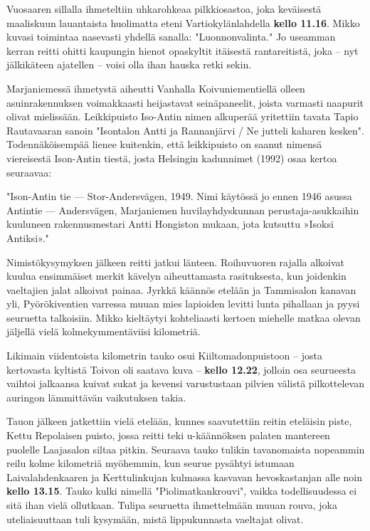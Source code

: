 \begin{multicols}{2}
	Vuosaaren sillalla ihmeteltiin uhkarohkeaa pilkkiosastoa, joka
	keväisestä maaliskuun lauantaista huolimatta eteni Vartiokylänlahdella
	\textbf{kello 11.16}. Mikko kuvasi toimintaa nasevasti yhdellä sanalla:
	"Luonnonvalinta." Jo useamman kerran reitti ohitti kaupungin hienot
	opaskyltit itäisestä rantareitistä, joka – nyt jälkikäteen ajatellen –
	voisi olla ihan hauska retki sekin.

	Marjaniemessä ihmetystä aiheutti Vanhalla Koivuniementiellä olleen
	asuinrakennuksen voimakkaasti heijastavat seinäpaneelit, joista
	varmasti naapurit olivat mielissään. Leikkipuisto Iso-Antin nimen
	alkuperää yritettiin tavata Tapio Rautavaaran sanoin "Isontalon Antti
	ja Rannanjärvi / Ne jutteli kaharen kesken". Todennäköisempää lienee
	kuitenkin, että leikkipuisto on saanut nimensä viereisestä Ison-Antin
	tiestä, josta Helsingin kadunnimet (1992) osaa kertoa seuraavaa:

	"Ison-Antin tie — Stor-Andersvägen, 1949. Nimi käytössä jo ennen 1946
	asussa Antintie — Andersvägen, Marjaniemen huvilayhdyskunnan
	perustaja-asukkaihin kuuluneen rakennusmestari Antti Hongiston mukaan,
	jota kutsuttu »Isoksi Antiksi»."

	Nimistökysymyksen jälkeen reitti jatkui länteen. Roihuvuoren rajalla
	alkoivat kuulua ensimmäiset merkit kävelyn aiheuttamasta rasituksesta,
	kun joidenkin vaeltajien jalat alkoivat painaa. Jyrkkä käännös etelään
	ja Tammisalon kanavan yli, Pyörökiventien varressa muuan mies lapioiden
	levitti lunta pihallaan ja pyysi seuruetta talkoisiin. Mikko kieltäytyi
	kohteliaasti kertoen miehelle matkaa olevan jäljellä vielä
	kolmekymmentäviisi kilometriä.

	Likimain viidentoista kilometrin tauko osui Kiiltomadonpuistoon – josta
	kertovasta kyltistä Toivon oli saatava kuva – \textbf{kello 12.22},
	jolloin osa seurueesta vaihtoi jalkaansa kuivat sukat ja kevensi
	varustustaan pilvien välistä pilkottelevan auringon lämmittävän
	vaikutuksen takia.

	Tauon jälkeen jatkettiin vielä etelään, kunnes saavutettiin reitin
	eteläisin piste, Kettu Repolaisen puisto, jossa reitti teki
	u-käännöksen palaten mantereen puolelle Laajasalon siltaa pitkin.
	Seuraava tauko tulikin tavanomaista nopeammin reilu kolme kilometriä
	myöhemmin, kun seurue pysähtyi istumaan Laivalahdenkaaren ja
	Kerttulinkujan kulmassa kasvavan hevoskastanjan alle noin \textbf{kello
	13.15}. Tauko kulki nimellä "Piolimatkankrouvi", vaikka todellisuudessa
	ei sitä ihan vielä ollutkaan. Tulipa seuruetta ihmettelmään muuan
	rouva, joka uteliaisuuttaan tuli kysymään, mistä lippukunnasta
	vaeltajat olivat.


\end{multicols}
